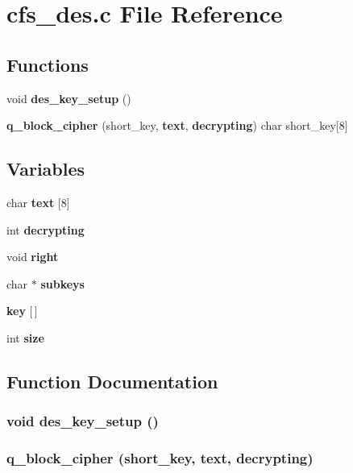 \section{cfs\_\-des.c File Reference}
\label{cfs__des_8c}


\subsection*{Functions}
\begin{CompactItemize}
\item 
void {\bf des\_\-key\_\-setup} ()
\item 
{\bf q\_\-block\_\-cipher} (short\_\-key, {\bf text}, {\bf decrypting}) char short\_\-key[8]
\end{CompactItemize}
\subsection*{Variables}
\begin{CompactItemize}
\item 
char {\bf text} [8]
\item 
int {\bf decrypting}
\item 
void {\bf right}
\item 
char $\ast$ {\bf subkeys}
\item 
{\bf key} [$\,$]
\item 
int {\bf size}
\end{CompactItemize}


\subsection{Function Documentation}
\subsubsection{\setlength{\rightskip}{0pt plus 5cm}void des\_\-key\_\-setup ()}\label{cfs__des_8c_a63}


\subsubsection{\setlength{\rightskip}{0pt plus 5cm}q\_\-block\_\-cipher (short\_\-key, {\bf text}, {\bf decrypting})}\label{cfs__des_8c_a64}




